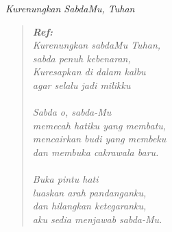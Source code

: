 \begin{center}
\itshape{Kurenungkan SabdaMu, Tuhan}
\end{center}

\small
\begin{verse}
\itshape{
\textbf{Ref:}\\
Kurenungkan sabdaMu Tuhan,\\ 
sabda penuh kebenaran,\\
Kuresapkan di dalam kalbu\\ 
agar selalu jadi milikku\\
{~}\\
Sabda o, sabda-Mu\\ 
memecah hatiku yang membatu,\\
mencairkan budi yang membeku\\
dan membuka cakrawala baru.\\
{~}\\
Buka pintu hati\\ 
luaskan arah pandanganku,\\
dan hilangkan ketegaranku, \\
aku sedia menjawab sabda-Mu.
}
\end{verse}
\normalsize